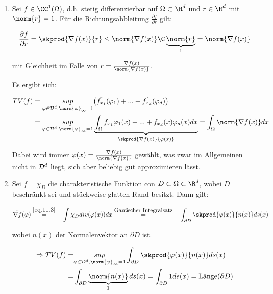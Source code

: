 \begin{enumerate}
    \item Sei $f \in \CC^1(\Omega)$, d.h. stetig differenzierbar auf $\Omega \subset \R^d$ und $r \in \R^d$ mit $\norm{r}=1$. Für die Richtungsabbleitung $\frac{\partial f}{\partial r}$ gilt:

    \[\frac{\partial f}{\partial r} = \skprod{\nabla f(x)}{r} \leq \norm{\nabla f(x)} \C \underbrace{\norm{r}}_{1} = \norm{\nabla f(x)}\]

    mit Gleichheit im Falle von $r = \frac{\nabla f(x)}{\norm{\nabla f(x)}}$.

    Es ergibt sich:

    \begin{align}\label{eq.11.5}
        TV(f) &= \underset{\varphi \in \D^d, \norm{\varphi}_\infty = 1}{sup} \bigl(\tilde{f_{x_1}}(\varphi_1) + ... + \tilde{f_{x_d}}(\varphi_d)\bigr) \nonumber \\
        &= \underset{\varphi \in \D^d, \norm{\varphi}_\infty = 1}{sup} \underbrace{\int_\Omega f_{x_1}\varphi_1(x) + ... + f_{x_d}(x)\varphi_d(x) dx}_{\skprod{\nabla f(x)}{\varphi(x)}} = \int_\Omega \norm{\nabla f(x)} dx
    \end{align}

    Dabei wird immer $\varphi(x) = \frac{\nabla f(x)}{\norm{\nabla f(x)}}$ gewählt, was zwar im Allgemeinen nicht in $\mathcal{D}^d$ liegt, sich aber beliebig gut approximieren lässt.

    \item Sei $f= \chi_D$ die charakteristische Funktion con $D \subset \Omega \subset \R^d$, wobei $D$ beschränkt sei und stückweise glatten Rand besitzt.
    Dann gilt:

    \[\tilde{\nabla f}(\varphi) \overset{\eqref{eq.11.3}}{=} - \int \chi_D div(\varphi(x)) dx \overset{\text{\small{Gaußscher Integralsatz}}}{=} -\int_{\partial D} \skprod{\varphi(x)}{n(x)} ds(x)\]

    wobei $n(x)$ der Normalenvektor an $\partial D$ ist.

    \begin{align}
        \Rightarrow TV(f) =& \underset{\varphi \in \D^d, \norm{\varphi}_\infty = 1}{sup} \int_{\partial D} \skprod{\varphi(x)}{n(x)} ds(x) \nonumber \\
        =& \int_{\partial D}\underbrace{\norm{n(x)}}_{1} ds(x) = \int_{\partial D} 1 ds(x) = \text{Länge}(\partial D)
    \end{align}
\end{enumerate}

